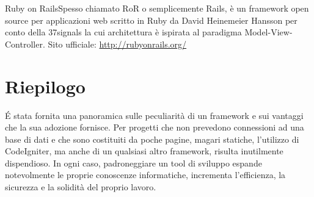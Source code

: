 \begin{deftab}{Ruby on Rails}{Spesso chiamato RoR o semplicemente Rails, è un framework open source per applicazioni web scritto in Ruby da David Heinemeier Hansson per conto della 37signals la cui architettura è ispirata al paradigma Model-View-Controller. Sito ufficiale: \url{http://rubyonrails.org/}}
\end{deftab}

\section{Riepilogo}
\'E stata fornita una panoramica sulle peculiarità  di un framework e sui vantaggi che la sua adozione fornisce. Per progetti che non prevedono connessioni ad una base di dati e che sono costituiti da poche pagine, magari statiche, l'utilizzo di CodeIgniter, ma anche di un qualsiasi altro framework, risulta inutilmente dispendioso. In ogni caso, padroneggiare un tool di sviluppo espande notevolmente le proprie conoscenze informatiche, incrementa l'efficienza, la sicurezza e la solidità del proprio lavoro.